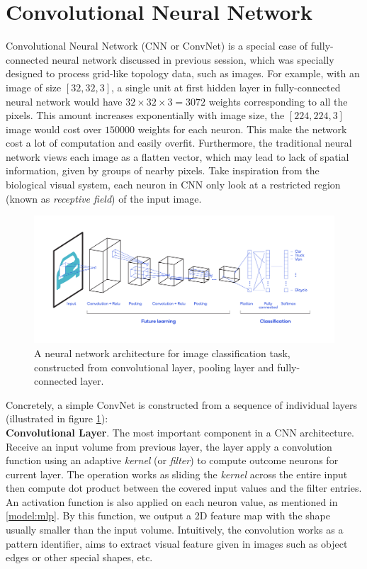 \section{Convolutional Neural Network}
\label{model:cnn}
Convolutional Neural Network (CNN or ConvNet) is a special case of fully-connected neural network discussed in previous session, which was specially designed to process grid-like topology data, such as images.
For example, with an image of size $[32, 32, 3]$, a single unit at first hidden layer in fully-connected neural network would have $32 \times 32 \times 3 = 3072$ weights corresponding to all the pixels. 
This amount increases exponentially with image size, the $[224, 224, 3]$ image would cost over $150000$ weights for each neuron. 
This make the network cost a lot of computation and easily overfit.
Furthermore, the traditional neural network views each image as a flatten vector, which may lead to lack of spatial information, given by groups of nearby pixels. Take inspiration from the biological visual system, each neuron in CNN only look at a restricted region (known as \textit{receptive field}) of the input image. \\
\begin{figure}[t!]
    \centering
    \includegraphics[width=\textwidth]{images/CNN.png}
    \caption{A neural network architecture for image classification task, constructed from convolutional layer, pooling layer and fully-connected layer.}
    \label{fig:cnn}
\end{figure}
Concretely, a simple ConvNet is constructed from a sequence of individual layers (illustrated in figure \ref{fig:cnn}): \\
\textbf{Convolutional Layer}. \quad The most important component in a CNN architecture. Receive an input volume from previous layer, the layer apply a convolution function using an adaptive \textit{kernel} (or \textit{filter}) to compute outcome neurons for current layer. The operation works as sliding the \textit{kernel} across the entire input then compute dot product between the covered input values and the filter entries. An activation function is also applied on each neuron value, as mentioned in \ref{model:mlp}. By this function, we output a 2D feature map with the shape usually smaller than the input volume. Intuitively, the convolution works as a pattern identifier, aims to extract visual feature given in images such as object edges or other special shapes, etc. \\
